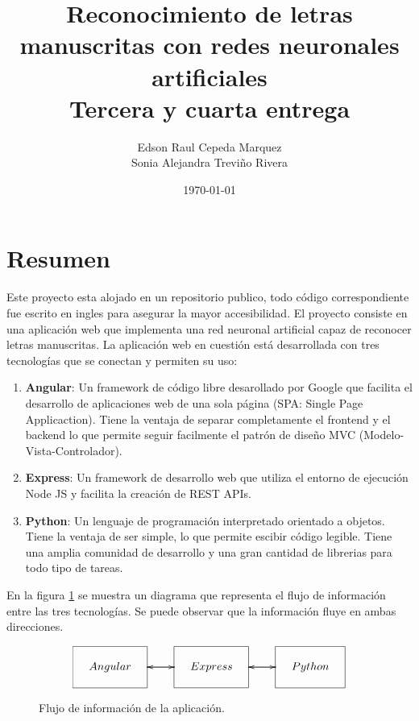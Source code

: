 \documentclass{article}
\title{
    Reconocimiento de letras manuscritas con redes neuronales artificiales\\ 
    \large Tercera y cuarta entrega}
\author{Edson Raul Cepeda Marquez \\ Sonia Alejandra Treviño Rivera}
\date{\today}
\begin{document}
\setlength{\parskip}{2mm}
\setlength{\parindent}{0pt}
\maketitle
\section{Resumen}\label{sec:Resumen}
Este proyecto esta alojado en un repositorio publico, todo código correspondiente fue escrito en ingles para asegurar la mayor accesibilidad. 
El proyecto consiste en una aplicación web que implementa una red neuronal artificial capaz 
de reconocer letras manuscritas. La aplicación web en cuestión está desarrollada con tres tecnologías 
que se conectan y permiten su uso:
\begin{enumerate}
    \item \textbf{Angular}: Un framework de código libre desarollado por Google que facilita el desarrollo de 
    aplicaciones web de una sola página (SPA: Single Page Applicaction). Tiene la ventaja de separar completamente el frontend y el backend lo que permite
    seguir facilmente el patrón de diseño MVC (Modelo-Vista-Controlador). 
    \item \textbf{Express}: Un framework de desarrollo web que utiliza el entorno de ejecución Node JS y facilita la creación de REST APIs.
    \item \textbf{Python}: Un lenguaje de programación interpretado orientado a objetos. Tiene la ventaja de ser simple, lo que permite escibir código legible.
    Tiene una amplia comunidad de desarrollo y una gran cantidad de librerias para todo tipo de tareas.
\end{enumerate}
En la figura \ref{flujo} se muestra un diagrama que representa el flujo de información entre las tres tecnologías. Se puede observar que la información fluye en ambas direcciones. 
\begin{figure}[H]
    \begin{displaymath}
        \xymatrix{*+<1cm>[F]{Angular} \ar[r] & *+<1cm>[F]{Express} \ar[l] \ar[r] & *+<1cm>[F]{Python} \ar[l]}
    \end{displaymath}
    \caption{Flujo de información de la aplicación.}
    \label{flujo} 
\end{figure}
\end{document}
